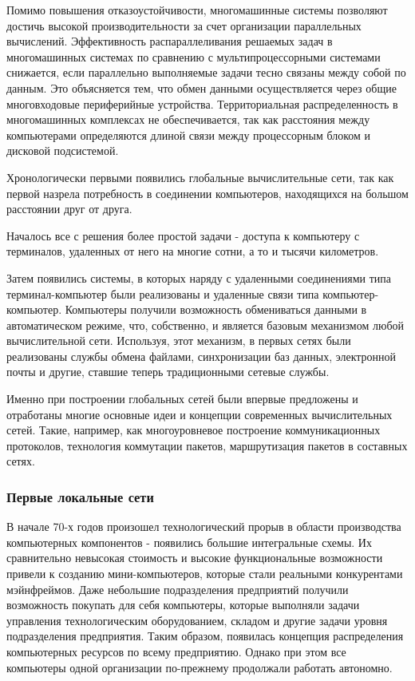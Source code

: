 Помимо повышения отказоустойчивости, многомашинные системы позволяют достичь высокой производительности за счет организации параллельных вычислений.
Эффективность распараллеливания решаемых задач в многомашинных системах по сравнению с мультипроцессорными системами снижается, если параллельно выполняемые задачи тесно связаны между собой по данным.
Это объясняется тем, что обмен данными осуществляется через общие многовходовые периферийные устройства.
Территориальная распределенность в многомашинных комплексах не обеспечивается, так как расстояния между компьютерами определяются длиной связи между процессорным блоком и дисковой подсистемой.

Хронологически первыми появились глобальные вычислительные сети, так как первой назрела потребность в соединении компьютеров, находящихся на большом расстоянии друг от друга.

Началось все с решения более простой задачи - доступа к компьютеру с терминалов, удаленных от него на многие сотни, а то и тысячи километров.

Затем появились системы, в которых наряду с удаленными соединениями типа терминал-компьютер были реализованы и удаленные связи типа компьютер-компьютер.
Компьютеры получили возможность обмениваться данными в автоматическом режиме, что, собственно, и является базовым механизмом любой вычислительной сети.
Используя, этот механизм, в первых сетях были реализованы службы обмена файлами, синхронизации баз данных, электронной почты и другие, ставшие теперь традиционными сетевые службы.

Именно при построении глобальных сетей были впервые предложены и отработаны многие основные идеи и концепции современных вычислительных сетей.
Такие, например, как многоуровневое построение коммуникационных протоколов, технология коммутации пакетов, маршрутизация пакетов в составных сетях.

\subsubsection{Первые локальные сети}

В начале 70-х годов произошел технологический прорыв в области производства компьютерных компонентов - появились большие интегральные схемы.
Их сравнительно невысокая стоимость и высокие функциональные возможности привели к созданию мини-компьютеров, которые стали реальными конкурентами мэйнфреймов.
Даже небольшие подразделения предприятий получили возможность покупать для себя компьютеры, которые выполняли задачи управления технологическим оборудованием, складом и другие задачи уровня подразделения предприятия.
Таким образом, появилась концепция распределения компьютерных ресурсов по всему предприятию.
Однако при этом все компьютеры одной организации по-прежнему продолжали работать автономно.

